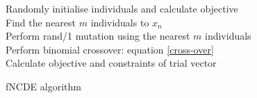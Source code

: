 \begin{algorithm}
\SetAlgoNoLine
 Randomly initialise individuals and calculate objective\\
 {
  {
  Find the nearest $m$ individuals to $x_n$\\
  Perform rand/1 mutation using the nearest $m$ individuals\\
  Perform binomial crossover: equation \ref{cross-over}\\
  Calculate objective and constraints of trial vector
  }
 }
 \caption{fNCDE algorithm}
 \label{fNCDE algorithm}
\end{algorithm}